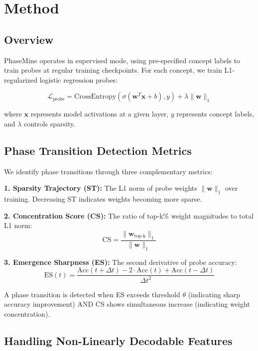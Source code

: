 \documentclass{article}
\begin{document}
\section{Method}

\subsection{Overview}

PhaseMine operates in supervised mode, using pre-specified concept labels to train probes at regular training checkpoints. For each concept, we train L1-regularized logistic regression probes:

\begin{equation}
\mathcal{L}_{\text{probe}} = \text{CrossEntropy}(\sigma(\mathbf{w}^T \mathbf{x} + b), y) + \lambda \|\mathbf{w}\|_1
\end{equation}

where $\mathbf{x}$ represents model activations at a given layer, $y$ represents concept labels, and $\lambda$ controls sparsity.

\subsection{Phase Transition Detection Metrics}

We identify phase transitions through three complementary metrics:

\textbf{1. Sparsity Trajectory (ST):} The L1 norm of probe weights $\|\mathbf{w}\|_1$ over training. Decreasing ST indicates weights becoming more sparse.

\textbf{2. Concentration Score (CS):} The ratio of top-k\% weight magnitudes to total L1 norm:
\begin{equation}
\text{CS} = \frac{\|\mathbf{w}_{\text{top-k}}\|_1}{\|\mathbf{w}\|_1}
\end{equation}

\textbf{3. Emergence Sharpness (ES):} The second derivative of probe accuracy:
\begin{equation}
\text{ES}(t) = \frac{\text{Acc}(t+\Delta t) - 2 \cdot \text{Acc}(t) + \text{Acc}(t-\Delta t)}{\Delta t^2}
\end{equation}

A phase transition is detected when ES exceeds threshold $\theta$ (indicating sharp accuracy improvement) AND CS shows simultaneous increase (indicating weight concentration).

\subsection{Handling Non-Linearly Decodable Features}
\end{document}
